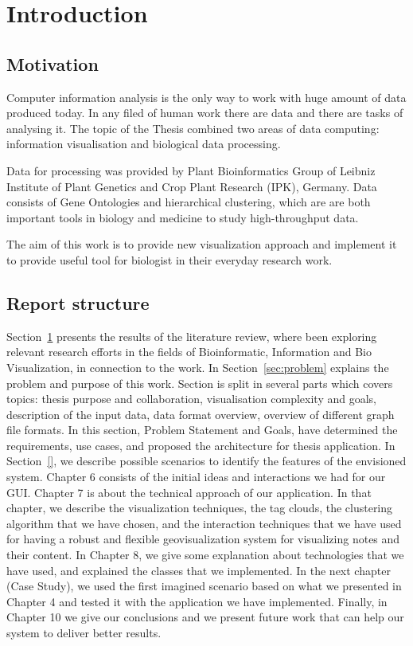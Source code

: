 \section{Introduction}
\label{sec:introduction}

\subsection{Motivation}
\label{sec:motivation}

Computer information analysis is the only way to work with huge amount of data produced today. In any filed of human work there are data and there are tasks of analysing it. The topic of the Thesis combined two areas of data computing: information visualisation and biological data processing.

Data for processing was provided by Plant Bioinformatics Group of Leibniz Institute of Plant Genetics and Crop Plant Research (IPK), Germany. Data consists of Gene Ontologies and hierarchical clustering, which are are both important tools in biology and medicine to study high-throughput data.

The aim of this work is to provide new visualization approach and implement it to provide useful tool for biologist in their everyday research work.

\subsection{Report structure}
\label{sec:structure}

Section~\ref{sec:introduction} presents the results of the literature review, where been exploring relevant research efforts in the fields of Bioinformatic, Information and Bio Visualization, in connection to the work. In Section~\ref{sec:problem} explains the problem and purpose of this work. Section is split in several parts which covers topics: thesis purpose and collaboration, visualisation complexity and goals, description of the input data, data format overview, overview of different graph file formats. In this section, Problem Statement and Goals, have determined the requirements, use cases, and proposed the architecture for thesis application. In Section~\ref{}, we describe possible scenarios to identify the features of the envisioned system.  Chapter 6 consists of the initial ideas and interactions we had for our GUI. Chapter 7 is about the technical approach of our application. In that chapter, we describe the visualization techniques, the tag clouds, the clustering algorithm that we have chosen, and the interaction techniques that we have used for having a robust and flexible geovisualization system for visualizing notes and their content. In Chapter 8, we give some explanation about technologies that we have used, and explained the classes that we implemented. In the next chapter (Case Study), we used the first imagined scenario based on what we presented in Chapter 4 and tested it with the application we have implemented. Finally, in Chapter 10 we give our conclusions and we present future work that can help our system to deliver better results.

